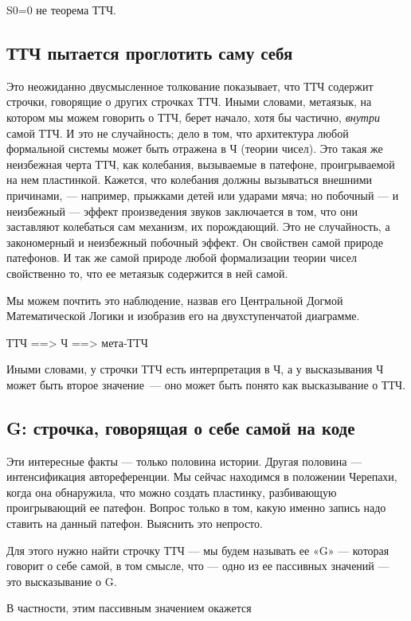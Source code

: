 \documentclass[../main.tex]{subfiles}
\begin{document}
S0=0 не теорема ТТЧ.


\subsection{ТТЧ пытается проглотить саму себя}

Это неожиданно двусмысленное толкование показывает, что ТТЧ содержит строчки, говорящие о других строчках ТТЧ. Иными словами, метаязык, на котором мы можем говорить о ТТЧ, берет начало, хотя бы частично, \emph{внутри} самой ТТЧ. И это не случайность; дело в том, что архитектура любой формальной системы может быть отражена в Ч (теории чисел). Это такая же неизбежная черта ТТЧ, как колебания, вызываемые в патефоне, проигрываемой на нем пластинкой. Кажется, что колебания должны вызываться внешними причинами, --- например, прыжками детей или ударами мяча; но побочный --- и неизбежный --- эффект произведения звуков заключается в том, что они заставляют колебаться сам механизм, их порождающий. Это не случайность, а закономерный и неизбежный побочный эффект. Он свойствен самой природе патефонов. И так же самой природе любой формализации теории чисел свойственно то, что ее метаязык содержится в ней самой.

Мы можем почтить это наблюдение, назвав его Центральной Догмой Математической Логики и изобразив его на двухступенчатой диаграмме.

ТТЧ ==\textgreater{} Ч ==\textgreater{} мета-ТТЧ

Иными словами, у строчки ТТЧ есть интерпретация в Ч, а у высказывания Ч может быть второе значение~--- оно может быть понято как высказывание о ТТЧ.


\subsection{G: строчка, говорящая о себе самой на коде}

Эти интересные факты --- только половина истории. Другая половина --- интенсификация автореференции. Мы сейчас находимся в положении Черепахи, когда она обнаружила, что можно создать пластинку, разбивающую проигрывающий ее патефон. Вопрос только в том, какую именно запись надо ставить на данный патефон. Выяснить это непросто.

Для этого нужно найти строчку ТТЧ --- мы будем называть ее «G» --- которая говорит о себе самой, в том смысле, что --- одно из ее пассивных значений --- это высказывание о G.

В частности, этим пассивным значением окажется
\end{document}
